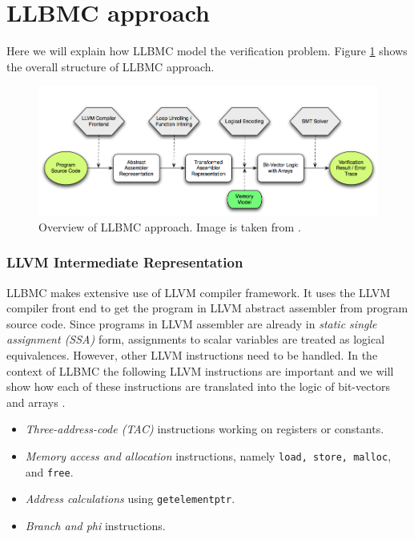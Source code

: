 \documentclass[14pt]{article}
\begin{document}
{\section{LLBMC approach}\label{llbmc approach}
Here we will explain how LLBMC model the verification problem. Figure \ref{fig:llbmc_overview} shows the overall structure of LLBMC approach. 
\begin{figure}[htb!]
  \begin{centering}
    \includegraphics[scale=0.5]{figures/llbmc_overview}\par
  \end{centering}
  \caption{ Overview of LLBMC approach. Image is taken from \cite{llbmc2}.}
  \label{fig:llbmc_overview}
\end{figure}



\subsubsection*{LLVM Intermediate Representation}
LLBMC makes extensive use of LLVM compiler framework. It uses the LLVM compiler front end to get the program in LLVM abstract assembler from program source code. Since programs in LLVM assembler are already in \textit{static single assignment (SSA)} form, assignments to scalar variables are treated as logical equivalences. However, other LLVM instructions need to be handled. 
In the context of LLBMC the following LLVM instructions are important and we will show how each of these instructions are translated into the logic of bit-vectors and arrays \cite{bit vectors and arrays}. 
\begin{itemize}
  \item \textit{Three-address-code (TAC)} instructions working on registers or constants.
  \item \textit{Memory access and allocation} instructions, namely \texttt{load, store, malloc}, and \texttt{free}.
  \item \textit{Address calculations} using \texttt{getelementptr}.
  \item \textit{Branch and phi} instructions.
\end{itemize}

}
\end{document}

